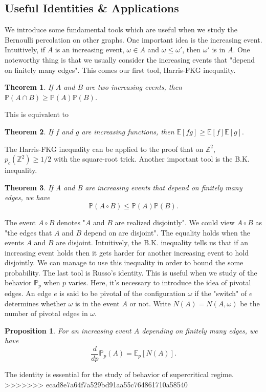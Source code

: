 \documentclass[12pt]{article}
\theoremstyle{plane}
\newtheorem*{thm}{Theorem}
\newtheorem*{prop}{Proposition}
\theoremstyle{definition}
\begin{document}
\subsection{Useful Identities \& Applications}
We introduce some fundamental tools which are useful when we study the Bernoulli percolation on other graphs. One important idea is the increasing event. Intuitively, if $A$ is an increasing event, $\omega\in A$ and $\omega\leq\omega'$, then $\omega'$ is in $A$. One noteworthy thing is that we usually consider the increasing events that "depend on finitely many edges". This comes our first tool, Harris-FKG inequality.
\begin{thm}
If $A$ and $B$ are two increasing events, then $\mathbb{P}(A\cap B)\geq \mathbb{P}(A)\mathbb{P}(B)$.
\end{thm}
This is equivalent to 
\begin{thm}
If \(f\) and \(g\) are increasing functions, then $\mathbb{E}[fg]\geq\mathbb{E}[f]\mathbb{E}[g].$
\end{thm}
The Harris-FKG inequality can be applied to the proof that on $\mathbb{Z}^2$, $p_c(\mathbb{Z}^2)\geq 1/2$ with the square-root trick. Another important tool is the B.K. inequality.
\begin{thm}
If A and B are increasing events that depend on finitely many edges, we have \[\mathbb{P}(A\circ B)\leq\mathbb{P}(A)\mathbb{P}(B).\]
\end{thm}
The event $A\circ B$ denotes "$A$ and $B$ are realized disjointly". We could view $A\circ B$ as "the edges that $A$ and $B$ depend on are disjoint". The equality holds when the events $A$ and $B$ are disjoint. Intuitively, the B.K. inequality tells us that if an increasing event holds then it gets harder for another increasing event to hold disjointly. We can manage to use this inequality in order to bound the some probability. The last tool is Russo's identity. This is useful when we study of the behavior $\mathbb{P}_p$ when $p$ varies. Here, it's necessary to introduce the idea of 
pivotal edges. An edge $e$ is said to be pivotal of the configuration $\omega$ if the "switch" of $e$ determines whether $\omega$ is in the event $A$ or not. Write $N(A)=N(A,\omega)$ be the number of pivotal edges in $\omega$. 
\begin{prop}
For an increasing event $A$ depending on finitely many edges, we have \[\frac{d}{dp}\mathbb{P}_p (A)=\mathbb{E}_p[N(A)].\]
\end{prop}
The identity is essential for the study of behavior of supercritical regime. 
>>>>>>> ecad8e7a64f7a529bd91aa55c764861710a58540
\end{document}
